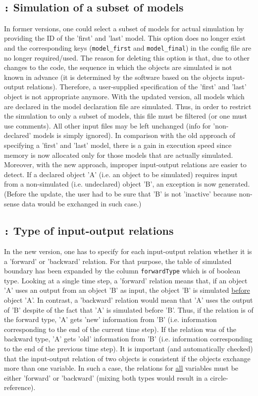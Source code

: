 \documentclass[a4paper,10pt]{article}
\newcommand{\logentry}[2]{\subsection*{\texttt{\color{red}{#1}:} \large{\textbf{#2}}}}
\begin{document}
\logentry{2011-10-24}{Simulation of a subset of models}
In former versions, one could select a subset of models for actual simulation by providing the ID of the 'first' and 'last' model. This option does no longer exist and the corresponding keys (\verb!model_first! and \verb!model_final!) in the config file are no longer required/used. The reason for deleting this option is that, due to other changes to the code, the sequence in which the objects are simulated is not known in advance (it is determined by the software based on the objects input-output relations). Therefore, a user-supplied specification of the 'first' and 'last' object is not appropriate anymore. With the updated version, all models which are declared in the model declaration file are simulated. Thus, in order to restrict the simulation to only a subset of models, this file must be filtered (or one must use comments). All other input files may be left unchanged (info for 'non-declared' models is simply ignored). In comparison with the old approach of specifying a 'first' and 'last' model, there is a gain in execution speed since memory is now allocated only for those models that are actually simulated. Moreover, with the new approach, improper input-output relations are easier to detect. If a declared object 'A' (i.e. an object to be simulated) requires input from a non-simulated (i.e. undeclared) object 'B', an exception is now generated. (Before the update, the user had to be sure that 'B' is not 'inactive' because non-sense data would be exchanged in such case.)

\logentry{2011-10-24}{Type of input-output relations}
In the new version, one has to specify for each input-output relation whether it is a 'forward' or 'backward' relation. For that purpose, the table of simulated boundary has been expanded by the column \verb!forwardType! which is of boolean type. Looking at a single time step, a 'forward' relation means that, if an object 'A' uses an output from an object 'B' as input, the object 'B' is simulated \underline{before} object 'A'. In contrast, a 'backward' relation would mean that 'A' uses the output of 'B' despite of the fact that 'A' is simulated before 'B'. Thus, if the relation is of the forward type, 'A' gets 'new' information from 'B' (i.e. information corresponding to the end of the current time step). If the relation was of the backward type, 'A' gets 'old' information from 'B' (i.e. information corresponding to the end of the previous time step).
It is important (and automatically checked) that the input-output relation of two objects is consistent if the objects exchange more than one variable. In such a case, the relations for \underline{all} variables must be either 'forward' or 'backward' (mixing both types would result in a circle-reference).
\end{document}
